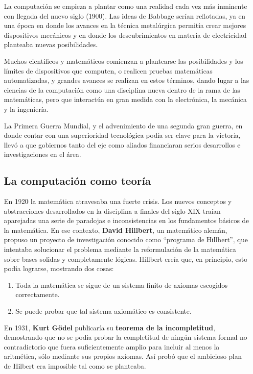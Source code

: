 La computación se empieza a plantar como una realidad cada vez más inminente con
llegada del nuevo siglo (1900). Las ideas de Babbage serían reflotadas, ya en
una época en donde los avances en la técnica metalúrgica permitía crear mejores
dispositivos mecánicos y en donde los descubrimientos en materia de electricidad
planteaba nuevas posibilidades.

Muchos científicos y matemáticos comienzan a plantearse las posibilidades y los
límites de dispositivos que computen, o realicen pruebas matemáticas automatizadas,
y grandes avances se realizan en estos términos, dando lugar a las ciencias de la
computación como una disciplina nueva dentro de la rama de las matemáticas, pero
que interactúa en gran medida con la electrónica, la mecánica y la ingeniería.

La Primera Guerra Mundial, y el advenimiento de una segunda gran guerra, en donde
contar con una superioridad tecnológica podía ser clave para la victoria, llevó
a que gobiernos tanto del eje como aliados financiaran serios desarrollos e
investigaciones en el área.

\subsection{La computación como teoría}

En 1920 la matemática atravesaba una fuerte crisis. Los nuevos conceptos y
abstracciones desarrollados en la disciplina a finales del siglo XIX traían
aparejadas una serie de paradojas e inconsistencias en los fundamentos básicos
de la matemática. En ese contexto, \textbf{David Hillbert}, un matemático
alemán, propuso un proyecto de investigación conocido como ``programa de Hillbert'',
que intentaba solucionar el problema mediante la reformulación de la matemática
sobre bases solidas y completamente lógicas. Hillbert creía que, en principio,
esto podía lograrse, mostrando dos cosas:
\begin{enumerate}
    \item Toda la matemática se sigue de un sistema finito de axiomas escogidos correctamente.
    \item Se puede probar que tal sistema axiomático es consistente.
\end{enumerate}

En 1931, \textbf{Kurt Gödel} publicaría su \textbf{teorema de la incompletitud},
demostrando que no se podía probar la completitud de ningún sistema formal no
contradictorio que fuera suficientemente amplio para incluir al menos la
aritmética, sólo mediante sus propios axiomas. Así probó que el ambicioso plan
de Hilbert era imposible tal como se planteaba.\autocite[cap. 3]{petzold_2008}

